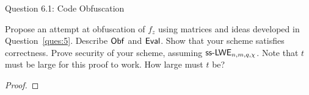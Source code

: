 \begin{solution}{Question 6.1: Code Obfuscation}\label{ques:61}
    \begin{question}
        Propose an attempt at obfuscation of $f_z$ using matrices and ideas developed in Question~\ref{ques:5}. Describe $\mathsf{Obf}$ and $\mathsf{Eval}$. Show that your scheme satisfies correctness. Prove security of your scheme, assuming $\mathsf{ss\text{-}LWE}_{n,m,q,\chi}$. Note that $t$ must be large for this proof to work. How large must $t$ be?
    \end{question}
    \tcblower{}
    \begin{proof}
    \end{proof}
\end{solution}
